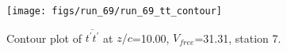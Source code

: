 \begin{figure}[H]
\centering
\texttt{[image: figs/run\_69/run\_69\_tt\_contour]}
\caption{Contour plot of $\overline{t^\prime t^\prime}$ at $z/c$=10.00, $V_{free}$=31.31, station 7.}
\label{fig:run_69_tt_contour}
\end{figure}


